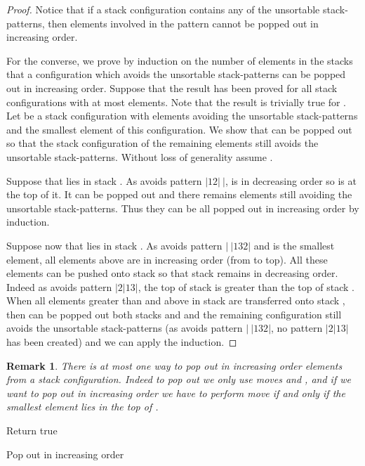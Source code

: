 \documentclass[11pt]{article}
\newtheorem{rem}[thm]{Remark}
\newcommand{\patternV}{\ensuremath{|12|\ |}\xspace}
\newcommand{\patternH}{\ensuremath{|\ |132|}\xspace}
\newcommand{\patternVH}{\ensuremath{|2|13|}\xspace}
\begin{document}
\begin{proof}
Notice that if a stack configuration contains any of the  unsortable stack-patterns, then elements involved in the pattern cannot be popped out in increasing order.

For the converse, we prove by induction on the number of elements in the stacks that a configuration which avoids the  unsortable stack-patterns can be popped out in increasing order. 
Suppose that the result has been proved for all stack configurations with at most  elements. 
Note that the result is trivially true for . 
Let  be a stack configuration with  elements avoiding the  unsortable stack-patterns and  the smallest element of this configuration.
We show that  can be popped out so that the stack configuration of the  remaining elements still avoids the  unsortable stack-patterns.
Without loss of generality assume .

Suppose that  lies in stack . 
As  avoids pattern \patternV,  is in decreasing order so  is at the top of it. 
It can be popped out and there remains  elements still avoiding the  unsortable stack-patterns. 
Thus they can be all popped out in increasing order by induction. 

Suppose now that  lies in stack . 
As  avoids pattern \patternH and  is the smallest element, all elements above  are in increasing order (from  to top). 
All these elements can be pushed onto stack  so that stack  remains in decreasing order. 
Indeed as  avoids pattern \patternVH , the top of stack  is greater than the top of stack . 
When all elements greater than  and above  in stack  are transferred onto stack , then  can be popped out both stacks  and  and the remaining configuration still avoids the  unsortable stack-patterns (as  avoids pattern \patternH , no pattern \patternVH has been created) and we can apply the induction.
\end{proof}


\begin{rem}\label{rem:uniquePopOut}
There is at most one way to pop out in increasing order elements from a stack configuration. 
Indeed to pop out we only use moves  and , and if we want to pop out in increasing order we have to perform move  if and only if the smallest element lies in the top of .
\end{rem}

\begin{algorithm}[H]
  \SetAlgoLined
\LinesNumbered
\;
Return true\;
 \caption{Pop out in increasing order\label{algo:popOut}}
\end{algorithm}
\end{document}
